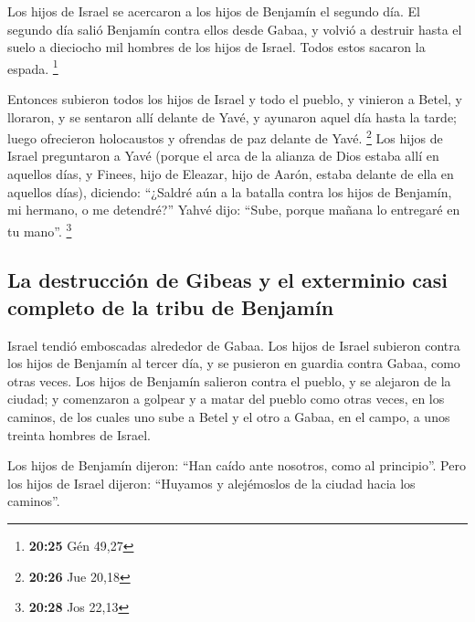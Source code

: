 \begin{paracol}{2}
 Los hijos de Israel se acercaron a los hijos de Benjamín
el segundo día.  El segundo día salió Benjamín contra
ellos desde Gabaa, y volvió a destruir hasta el suelo a dieciocho mil
hombres de los hijos de Israel. Todos estos sacaron la espada.
\footnote{\textbf{20:25} Gén 49,27}

 Entonces subieron todos los hijos de Israel y todo el
pueblo, y vinieron a Betel, y lloraron, y se sentaron allí delante de
Yavé, y ayunaron aquel día hasta la tarde; luego ofrecieron holocaustos
y ofrendas de paz delante de Yavé. \footnote{\textbf{20:26} Jue 20,18}
 Los hijos de Israel preguntaron a Yavé (porque el arca
de la alianza de Dios estaba allí en aquellos días,  y
Finees, hijo de Eleazar, hijo de Aarón, estaba delante de ella en
aquellos días), diciendo: ``¿Saldré aún a la batalla contra los hijos de
Benjamín, mi hermano, o me detendré?'' Yahvé dijo: ``Sube, porque mañana
lo entregaré en tu mano''. \footnote{\textbf{20:28} Jos 22,13}

\hypertarget{la-destrucciuxf3n-de-gibeas-y-el-exterminio-casi-completo-de-la-tribu-de-benjamuxedn}{%
\subsection{La destrucción de Gibeas y el exterminio casi completo de la
tribu de
Benjamín}\label{la-destrucciuxf3n-de-gibeas-y-el-exterminio-casi-completo-de-la-tribu-de-benjamuxedn}}

 Israel tendió emboscadas alrededor de Gabaa.
 Los hijos de Israel subieron contra los hijos de
Benjamín al tercer día, y se pusieron en guardia contra Gabaa, como
otras veces.  Los hijos de Benjamín salieron contra el
pueblo, y se alejaron de la ciudad; y comenzaron a golpear y a matar del
pueblo como otras veces, en los caminos, de los cuales uno sube a Betel
y el otro a Gabaa, en el campo, a unos treinta hombres de Israel.

 Los hijos de Benjamín dijeron: ``Han caído ante
nosotros, como al principio''. Pero los hijos de Israel dijeron:
``Huyamos y alejémoslos de la ciudad hacia los caminos''.


\end{paracol}
